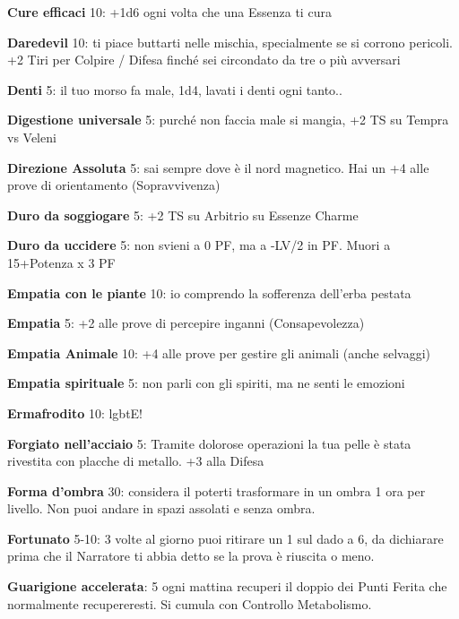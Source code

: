 \documentclass[a4paper,11pt,twoside,openany]{book}
\begin{document}
\textbf{Cure efficaci} 10: +1d6 ogni volta che una Essenza
ti cura

\textbf{Daredevil} 10: ti piace buttarti nelle mischia, specialmente se si corrono pericoli. +2 Tiri per Colpire / Difesa finché sei circondato da tre o più avversari

\textbf{Denti} 5: il tuo morso fa male, 1d4, lavati i denti ogni tanto..

\textbf{Digestione universale} 5: purché non faccia male si mangia, +2 TS su Tempra vs Veleni

\textbf{Direzione Assoluta} 5: sai sempre dove è il nord magnetico. Hai un +4 alle prove di orientamento (Sopravvivenza)

\textbf{Duro da soggiogare} 5: +2 TS su Arbitrio su Essenze Charme

\textbf{Duro da uccidere} 5: non svieni a 0 PF, ma a -LV/2 in PF. Muori a 15+Potenza x 3 PF

\textbf{Empatia con le piante} 10: io comprendo la sofferenza dell'erba pestata

\textbf{Empatia} 5: +2 alle prove di percepire inganni (Consapevolezza)

\textbf{Empatia Animale} 10: +4 alle prove per gestire gli animali (anche selvaggi)

\textbf{Empatia spirituale} 5: non parli con gli spiriti, ma ne senti le emozioni

\textbf{Ermafrodito} 10: lgbtE!

\textbf{Forgiato nell'acciaio} 5: Tramite dolorose operazioni la tua pelle è stata rivestita con placche di metallo. +3 alla Difesa

\textbf{Forma d'ombra} 30: considera il poterti trasformare in un ombra 1 ora per livello. Non puoi andare in spazi assolati e senza ombra.

\textbf{Fortunato} 5-10: 3 volte al giorno puoi ritirare un 1 sul dado a 6, da dichiarare prima che il Narratore ti abbia detto se la prova è riuscita o meno.

\textbf{Guarigione accelerata}: 5 ogni mattina recuperi il doppio dei Punti Ferita che normalmente recupereresti. Si cumula con Controllo Metabolismo. 
\end{document}
